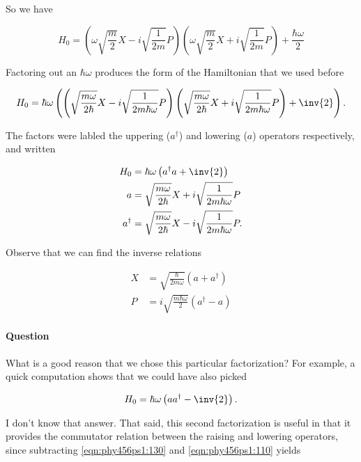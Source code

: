 So we have

\begin{equation}\label{eqn:phy456ps1:70}
H_0 =
\left(\omega \sqrt{\frac{m}{2}} X - i \sqrt{\frac{1}{2m}} P\right)\left(\omega \sqrt{\frac{m}{2}} X + i \sqrt{\frac{1}{2m}} P\right)
+ \frac{\hbar \omega}{2}
\end{equation}

Factoring out an $\hbar \omega$ produces the form of the Hamiltonian that we used before

\begin{equation}\label{eqn:phy456ps1:90}
H_0 =
\hbar \omega \left(
\left(\sqrt{\frac{m \omega}{2 \hbar}} X - i \sqrt{\frac{1}{2m \hbar \omega}} P\right)\left(\sqrt{\frac{m \omega}{2 \hbar}} X + i \sqrt{\frac{1}{2m \hbar \omega}} P\right)
+ \inv{2}
\right)
.
\end{equation}

The factors were labled the uppering ($a^\dagger$) and lowering ($a$) operators respectively, and written

\begin{align}\label{eqn:phy456ps1:110}
H_0 &= \hbar \omega \left( a^\dagger a + \inv{2} \right) \\
a &= \sqrt{\frac{m \omega}{2 \hbar}} X + i \sqrt{\frac{1}{2m \hbar \omega}} P \\
a^\dagger &= \sqrt{\frac{m \omega}{2 \hbar}} X - i \sqrt{\frac{1}{2m \hbar \omega}} P.
\end{align}

Observe that we can find the inverse relations

\begin{align}\label{eqn:phy456ps1:115}
X &= \sqrt{ \frac{\hbar}{2 m \omega} } \left( a + a^\dagger \right) \\
P &= i \sqrt{ \frac{m \hbar \omega}{2} } \left( a^\dagger  - a \right)
\end{align}

\paragraph{Question}
What is a good reason that we chose this particular factorization?  For example, a quick computation shows that we could have also picked

\begin{equation}\label{eqn:phy456ps1:130}
H_0 = \hbar \omega \left( a a^\dagger - \inv{2} \right).
\end{equation}

I don't know that answer.  That said, this second factorization is useful in that it provides the commutator relation between the raising and lowering operators, since subtracting \ref{eqn:phy456ps1:130} and \ref{eqn:phy456ps1:110} yields

